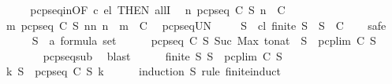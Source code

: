 \begin{isabellebody}
%
\isadelimproof
%
\endisadelimproof
%
\isatagproof
{}\isamarkupfalse%
\ {\isacharminus}\isanewline
\ \ \isamarkupfalse%
\ pcp{\isacharunderscore}seq{\isacharunderscore}in{\isacharbrackleft}OF\ c\ el{\isacharcomma}\ THEN\ allI{\isacharbrackright}\ \isamarkupfalse%
\ {\isachardoublequoteopen}{\isasymforall}n{\isachardot}\ pcp{\isacharunderscore}seq\ C\ S\ n\ {\isasymin}\ C{\isachardoublequoteclose}\ \isacommand{{\isachardot}}\isamarkupfalse%
\isanewline
\ \ \isamarkupfalse%
\ {\isachardoublequoteopen}{\isasymforall}m{\isachardot}\ {\isasymUnion}{\isacharbraceleft}pcp{\isacharunderscore}seq\ C\ S\ n{\isacharbar}n{\isachardot}\ n\ {\isasymle}\ m{\isacharbraceright}\ {\isasymin}\ C{\isachardoublequoteclose}\ \isamarkupfalse%
\ pcp{\isacharunderscore}seq{\isacharunderscore}UN\ \isacommand{{\isachardot}}\isamarkupfalse%
\isanewline
\ \ \isamarkupfalse%
\ {\isachardoublequoteopen}{\isasymforall}S{\isacharprime}\ {\isasymsubseteq}\ {\isacharquery}cl{\isachardot}\ finite\ S{\isacharprime}\ {\isasymlongrightarrow}\ S{\isacharprime}\ {\isasymin}\ C{\isachardoublequoteclose}\isanewline
\ \ \isamarkupfalse%
\ safe\isanewline
\ \ \ \ \isamarkupfalse%
\ S{\isacharprime}\ {\isacharcolon}{\isacharcolon}\ {\isachardoublequoteopen}{\isacharprime}a\ formula\ set{\isachardoublequoteclose}\isanewline
\ \ \ \ \isamarkupfalse%
\ {\isachardoublequoteopen}pcp{\isacharunderscore}seq\ C\ S\ {\isacharparenleft}Suc\ {\isacharparenleft}Max\ {\isacharparenleft}to{\isacharunderscore}nat\ {\isacharbackquote}\ S{\isacharprime}{\isacharparenright}{\isacharparenright}{\isacharparenright}\ {\isasymsubseteq}\ pcp{\isacharunderscore}lim\ C\ S{\isachardoublequoteclose}\ \isanewline
\ \ \ \ \ \ \isamarkupfalse%
\ pcp{\isacharunderscore}seq{\isacharunderscore}sub\ \isamarkupfalse%
\ blast\isanewline
\ \ \ \ \isamarkupfalse%
\ {\isacartoucheopen}finite\ S{\isacharprime}{\isacartoucheclose}\ {\isacartoucheopen}S{\isacharprime}\ {\isasymsubseteq}\ pcp{\isacharunderscore}lim\ C\ S{\isacartoucheclose}\isanewline
\ \ \ \ \isamarkupfalse%
\ {\isachardoublequoteopen}{\isasymexists}k{\isachardot}\ S{\isacharprime}\ {\isasymsubseteq}\ pcp{\isacharunderscore}seq\ C\ S\ k{\isachardoublequoteclose}\ \isanewline
\ \ \ \ \isamarkupfalse%
{\isacharparenleft}induction\ S{\isacharprime}\ rule{\isacharcolon}\ finite{\isacharunderscore}induct{\isacharparenright}\ \isanewline

\end{isabellebody}
